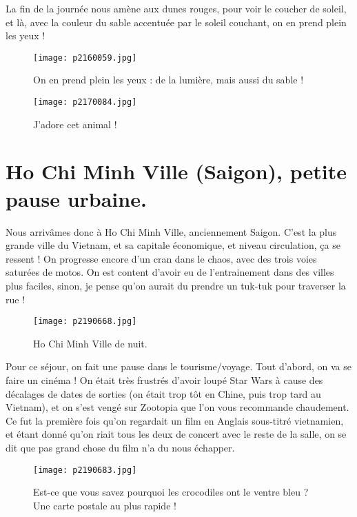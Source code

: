 \documentclass{book}
\begin{document}
La fin de la journée nous amène aux dunes rouges, pour voir le coucher de soleil, et là, avec la couleur du sable accentuée par le soleil couchant, on en prend plein les yeux !


\begin{figure}[h]
\centering
\texttt{[image: p2160059.jpg]}
\caption*{On en prend plein les yeux : de la lumière, mais aussi du sable !}
\end{figure}


\begin{figure}[h]
\centering
\texttt{[image: p2170084.jpg]}
\caption*{J'adore cet animal !}
\end{figure}



\chapter{Ho Chi Minh Ville (Saigon), petite pause urbaine.}
Nous arrivâmes donc à Ho Chi Minh Ville, anciennement Saigon. C'est la plus grande ville du Vietnam, et sa capitale économique, et niveau circulation, ça se ressent ! On progresse encore d'un cran dans le chaos, avec des trois voies saturées de motos. On est content d'avoir eu de l'entrainement dans des villes plus faciles, sinon, je pense qu'on aurait du prendre un tuk-tuk pour traverser la rue !


\begin{figure}[h]
\centering
\texttt{[image: p2190668.jpg]}
\caption*{Ho Chi Minh Ville de nuit.}
\end{figure}

Pour ce séjour, on fait une pause dans le tourisme/voyage. Tout d'abord, on va se faire un cinéma ! On était très frustrés d'avoir loupé Star Wars à cause des décalages de dates de sorties (on était trop tôt en Chine, puis trop tard au Vietnam), et on s'est vengé sur Zootopia que l'on vous recommande chaudement. Ce fut la première fois qu'on regardait un film en Anglais sous-titré vietnamien, et étant donné qu'on riait tous les deux de concert avec le reste de la salle, on se dit que pas grand chose du film n'a du nous échapper.




\begin{figure}[h]
\centering
\texttt{[image: p2190683.jpg]}
\caption*{Est-ce que vous savez pourquoi les crocodiles ont le ventre bleu ? Une carte postale au plus rapide !}
\end{figure}
\end{document}
